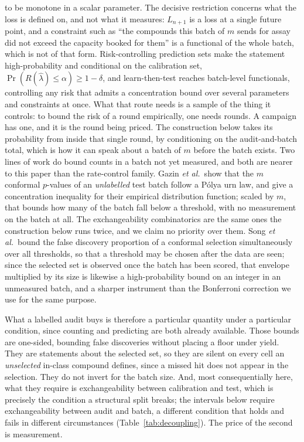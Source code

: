 \documentclass[twocolumn,10pt]{article}
\begin{document}
to be monotone in a scalar parameter.\citep{Angelopoulos2024CRC} The decisive restriction concerns what the loss is defined on, and not what it measures: $L_{n+1}$ is a loss at a single future point, and a
constraint such as ``the compounds this batch of $m$ sends for assay did not exceed the capacity booked for them'' is a functional of the whole batch, which is not of that form. Risk-controlling prediction sets make the statement
high-probability and conditional on the calibration set,
$\Pr(R(\hat\lambda)\le\alpha)\ge1-\delta$,\citep{bates2021distribution} and learn-then-test
reaches batch-level functionals, controlling any risk that admits a concentration bound over
several parameters and constraints at once.\citep{Angelopoulos2021LTT} What that route needs is
a sample of the thing it controls: to bound the risk of a round empirically, one needs rounds.
A campaign has one, and it is the round being priced. The construction below takes its
probability from inside that single round, by conditioning on the audit-and-batch total, which
is how it can speak about a batch of $m$ before the batch exists. Two lines of work do bound counts in a batch
not yet measured, and both are nearer to this paper than the rate-control family. Gazin
\textit{et al.}\ show that the $m$ conformal $p$-values of an \emph{unlabelled} test batch
follow a P\'olya urn law, and give a concentration inequality for their empirical distribution
function;\citep{Gazin2024Transductive} scaled by $m$, that bounds how many of the batch fall
below a threshold, with no measurement on the batch at all. The exchangeability combinatorics
are the same ones the construction below runs twice, and we claim no priority over them. Song
\textit{et al.}\ bound the false discovery proportion of a conformal selection simultaneously
over all thresholds, so that a threshold may be chosen after the data are
seen;\citep{Song2026FDP} since the selected set is observed once the batch has been scored,
that envelope multiplied by its size is likewise a high-probability bound on an integer in an
unmeasured batch, and a sharper instrument than the Bonferroni correction we use for the same
purpose.

What a labelled audit buys is therefore a particular quantity under a particular condition, since counting and predicting are both already available. Those bounds are one-sided, bounding false
discoveries without placing a floor under yield. They are statements about the selected set, so
they are silent on every cell an \emph{unselected} in-class compound defines, since a missed hit does not appear in the selection. They do not invert for the batch size. And, most consequentially here,
what they require is exchangeability between calibration and test, which is precisely the
condition a structural split breaks; the intervals below require exchangeability between audit
and batch, a different condition that holds and fails in different circumstances
(Table~\ref{tab:decoupling}). The price of the second is measurement.
\end{document}
